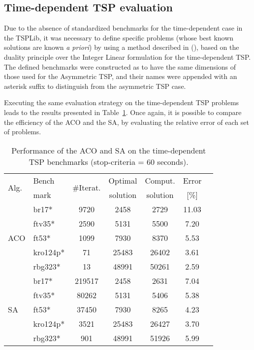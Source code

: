 \subsection{Time-dependent TSP evaluation}
\label{sec:tdtsp_eva}

Due to the absence of standardized benchmarks for the time-dependent case in the TSPLib, it was necessary to define specific problems (whose best known solutions are known \textit{a priori}) by using a method described in (\cite{TDTSP_construction}), based on the duality principle over the Integer Linear formulation for the time-dependent TSP. The defined benchmarks were constructed as to have the same dimensions of those used for the Asymmetric TSP, and their names were appended with an asterisk suffix to distinguish from the asymmetric TSP case.

Executing the same evaluation strategy on the time-dependent TSP problems leads to the results presented in Table~\ref{tab:tdtsp_results}. Once again, it is possible to compare the efficiency of the ACO and the SA, by evaluating the relative error of each set of problems.

\begin{table}[b]
\centering
\caption{Performance of the ACO and SA on the time-dependent TSP benchmarks (stop-criteria = 60 seconds).}
\label{tab:tdtsp_results}
\begin{tabular}{@{}l l@{}c c c c c@{}}
\hline
\multirow{2}{*}{Alg.}& Bench   & \multirow{2}{*}{\#Iterat.}  & Optimal  & Comput.  & Error  \\ 
                     & mark    &                             & solution & solution &  [\%]  \\ \hline
\multirow{5}{*}{ACO} & br17*    & 9720    & 2458        & 2729                 & 11.03          \\  
                     & ftv35*   & 2590    & 5131       & 5500              & 7.20       \\  
                     & ft53*    & 1099     & 7930      & 8370               & 5.53      \\ 
                     & kro124p*  & 71     & 25483     & 26402         & 3.61     \\   
                     & rbg323*  & 13      & 48991      & 50261                & 2.59      \\ \hline
\multirow{5}{*}{SA}  & br17*    & 219517  & 2458        & 2631             & 7.04          \\  
                     & ftv35*   & 80262   & 5131      & 5406			  & 5.38      \\  
                     & ft53*    & 37450   & 7930      & 8265           & 4.23      \\  
                     & kro124p*  & 3521    & 25483     & 26427         & 3.70     \\  
                     & rbg323*  & 901    & 48991      & 51926              & 5.99      \\ \hline
\end{tabular}
\end{table}

